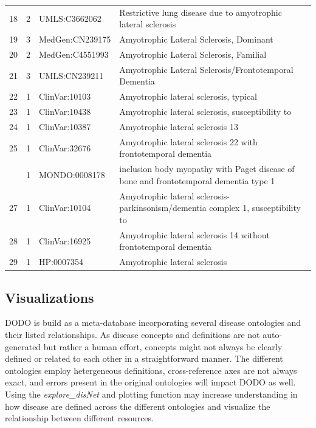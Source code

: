 \documentclass[9pt,a4paper,]{extarticle}
\begin{document}
\begin{table}
{\begin{tabular}[t]{rrll}
18 & 2 & UMLS:C3662062 & Restrictive lung disease due to amyotrophic lateral sclerosis\\
\rowcolor{gray!6}  19 & 3 & MedGen:CN239175 & Amyotrophic Lateral Sclerosis, Dominant\\
20 & 2 & MedGen:C4551993 & Amyotrophic Lateral Sclerosis, Familial\\
\addlinespace
\rowcolor{gray!6}  21 & 3 & UMLS:CN239211 & Amyotrophic Lateral Sclerosis/Frontotemporal Dementia\\
22 & 1 & ClinVar:10103 & Amyotrophic lateral sclerosis, typical\\
\rowcolor{gray!6}  23 & 1 & ClinVar:10438 & Amyotrophic lateral sclerosis, susceptibility to\\
24 & 1 & ClinVar:10387 & Amyotrophic lateral sclerosis 13\\
\rowcolor{gray!6}  25 & 1 & ClinVar:32676 & Amyotrophic lateral sclerosis 22 with frontotemporal dementia\\
\addlinespace
26 & 1 & MONDO:0008178 & inclusion body myopathy with Paget disease of bone and frontotemporal dementia type 1\\
\rowcolor{gray!6}  27 & 1 & ClinVar:10104 & Amyotrophic lateral sclerosis-parkinsonism/dementia complex 1, susceptibility to\\
28 & 1 & ClinVar:16925 & Amyotrophic lateral sclerosis 14 without frontotemporal dementia\\
\rowcolor{gray!6}  29 & 1 & HP:0007354 & Amyotrophic lateral sclerosis\\
\bottomrule
\end{tabular}}
\end{table}

\hypertarget{visualizations}{%
\subsection{Visualizations}\label{visualizations}}

DODO is build as a meta-database incorporating several disease ontologies and their listed relationships. As disease concepts and definitions are not auto-generated but rather a human effort, concepts might not always be clearly defined or related to each other in a straightforward manner. The different ontologies employ hetergeneous definitions, cross-reference axes are not always exact, and errors present in the original ontologies will impact DODO as well. Using the \emph{explore\_disNet} and plotting function may increase understanding in how disease are defined across the different ontologies and visualize the relationship between different resources.
\end{document}
